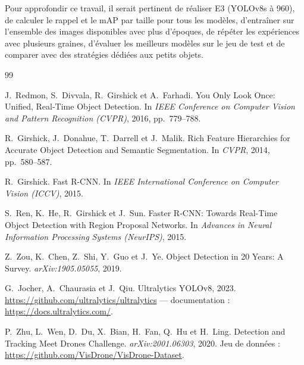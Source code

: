 \documentclass[11pt,a4paper]{article}
\begin{document}
Pour approfondir ce travail, il serait pertinent de réaliser E3 (YOLOv8s à
960), de calculer le rappel et le mAP par taille pour tous les modèles,
d'entraîner sur l'ensemble des images disponibles avec plus d'époques, de
répéter les expériences avec plusieurs graines, d'évaluer les meilleurs
modèles sur le jeu de test et de comparer avec des stratégies dédiées aux
petits objets.






\begin{thebibliography}{99}

J.~Redmon, S.~Divvala, R.~Girshick et A.~Farhadi.
\newblock You Only Look Once: Unified, Real-Time Object Detection.
\newblock In \emph{IEEE Conference on Computer Vision and Pattern Recognition (CVPR)}, 2016, pp.~779--788.

R.~Girshick, J.~Donahue, T.~Darrell et J.~Malik.
\newblock Rich Feature Hierarchies for Accurate Object Detection and Semantic Segmentation.
\newblock In \emph{CVPR}, 2014, pp.~580--587.

R.~Girshick.
\newblock Fast R-CNN.
\newblock In \emph{IEEE International Conference on Computer Vision (ICCV)}, 2015.

S.~Ren, K.~He, R.~Girshick et J.~Sun.
\newblock Faster R-CNN: Towards Real-Time Object Detection with Region Proposal Networks.
\newblock In \emph{Advances in Neural Information Processing Systems (NeurIPS)}, 2015.

Z.~Zou, K.~Chen, Z.~Shi, Y.~Guo et J.~Ye.
\newblock Object Detection in 20 Years: A Survey.
\newblock \emph{arXiv:1905.05055}, 2019.

G.~Jocher, A.~Chaurasia et J.~Qiu.
\newblock Ultralytics YOLOv8, 2023.
\newblock \url{https://github.com/ultralytics/ultralytics} --- documentation : \url{https://docs.ultralytics.com/}.

P.~Zhu, L.~Wen, D.~Du, X.~Bian, H.~Fan, Q.~Hu et H.~Ling.
\newblock Detection and Tracking Meet Drones Challenge.
\newblock \emph{arXiv:2001.06303}, 2020. Jeu de données : \url{https://github.com/VisDrone/VisDrone-Dataset}.


\end{thebibliography}
\end{document}
